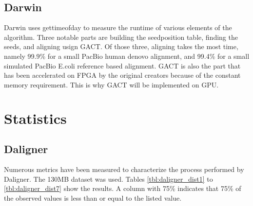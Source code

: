 \documentclass[../main/thesis.tex]{subfiles}
\begin{document}
\subsection{Darwin}
Darwin uses gettimeofday \cite{gettimeofday} to measure the runtime of various elements of the algorithm.
Three notable parts are building the seedposition table, finding the seeds, and aligning usign GACT.
Of those three, aligning takes the most time, namely 99.9\% for a small PacBio human denovo alignment, and 99.4\% for a small simulated PacBio E.coli reference based alignment.
GACT is also the part that has been accelerated on FPGA by the original creators because of the constant memory requirement.
This is why GACT will be implemented on GPU.

\section{Statistics}
\subsection{Daligner}
Numerous metrics have been measured to characterize the process performed by Daligner.
The 130MB dataset was used.
Tables \ref{tbl:daligner_dist1} to \ref{tbl:daligner_dist7} show the results.
A column with 75\% indicates that 75\% of the observed values is less than or equal to the listed value.
\end{document}
